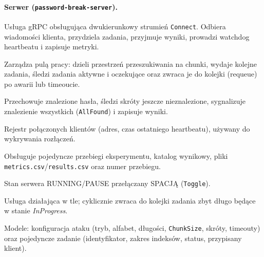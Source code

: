 \documentclass[11pt,a4paper]{article}
\begin{document}
\paragraph{Serwer (\texttt{password-break-server}).}
\begin{description}[style=nextline,leftmargin=0pt,itemsep=2pt]
  \item[\texttt{PasswordBreakerService}] Usługa gRPC obsługująca dwukierunkowy strumień
        \texttt{Connect}. Odbiera wiadomości klienta, przydziela zadania, przyjmuje wyniki,
        prowadzi watchdog heartbeatu i zapisuje metryki.
  \item[\texttt{TaskManager} (\texttt{ITaskManager})] Zarządza pulą pracy: dzieli przestrzeń
        przeszukiwania na chunki, wydaje kolejne zadania, śledzi zadania aktywne i oczekujące
        oraz zwraca je do kolejki (requeue) po awarii lub timeoucie.
  \item[\texttt{FoundPasswords}] Przechowuje znalezione hasła, śledzi skróty jeszcze
        nieznalezione, sygnalizuje znalezienie wszystkich (\texttt{AllFound}) i zapisuje wyniki.
  \item[\texttt{ClientTracker}] Rejestr połączonych klientów (adres, czas ostatniego heartbeatu),
        używany do wykrywania rozłączeń.
  \item[\texttt{ExperimentRunManager}] Obsługuje pojedyncze przebiegi eksperymentu, katalog
        wynikowy, pliki \texttt{metrics.csv}/\texttt{results.csv} oraz numer przebiegu.
  \item[\texttt{ServerRunState}] Stan serwera RUNNING/PAUSE przełączany SPACJĄ (\texttt{Toggle}).
  \item[\texttt{TaskTimeoutChecker}] Usługa działająca w tle; cyklicznie zwraca do kolejki
        zadania zbyt długo będące w stanie \emph{InProgress}.
  \item[\texttt{PasswordBreakConfig}, \texttt{TaskInfo}] Modele: konfiguracja ataku
        (tryb, alfabet, długości, \texttt{ChunkSize}, skróty, timeouty) oraz pojedyncze zadanie
        (identyfikator, zakres indeksów, status, przypisany klient).
\end{description}
\end{document}
